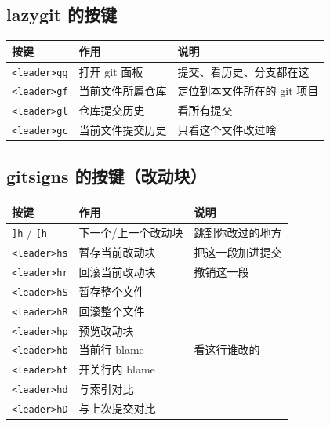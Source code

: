 \subsection{lazygit 的按键}

\begin{table}[htbp]
\centering
\begin{tabular}{lll}
\toprule
按键 & 作用 & 说明 \\
\midrule
\texttt{\textless leader\textgreater gg} & 打开 git 面板 & 提交、看历史、分支都在这 \\
\texttt{\textless leader\textgreater gf} & 当前文件所属仓库 & 定位到本文件所在的 git 项目 \\
\texttt{\textless leader\textgreater gl} & 仓库提交历史 & 看所有提交 \\
\texttt{\textless leader\textgreater gc} & 当前文件提交历史 & 只看这个文件改过啥 \\
\bottomrule
\end{tabular}
\end{table}

\subsection{gitsigns 的按键（改动块）}

\begin{table}[htbp]
\centering
\begin{tabular}{lll}
\toprule
按键 & 作用 & 说明 \\
\midrule
\texttt{]h} / \texttt{[h} & 下一个/上一个改动块 & 跳到你改过的地方 \\
\texttt{\textless leader\textgreater hs} & 暂存当前改动块 & 把这一段加进提交 \\
\texttt{\textless leader\textgreater hr} & 回滚当前改动块 & 撤销这一段 \\
\texttt{\textless leader\textgreater hS} & 暂存整个文件 & \\
\texttt{\textless leader\textgreater hR} & 回滚整个文件 & \\
\texttt{\textless leader\textgreater hp} & 预览改动块 & \\
\texttt{\textless leader\textgreater hb} & 当前行 blame & 看这行谁改的 \\
\texttt{\textless leader\textgreater ht} & 开关行内 blame & \\
\texttt{\textless leader\textgreater hd} & 与索引对比 & \\
\texttt{\textless leader\textgreater hD} & 与上次提交对比 & \\
\bottomrule
\end{tabular}
\end{table}

